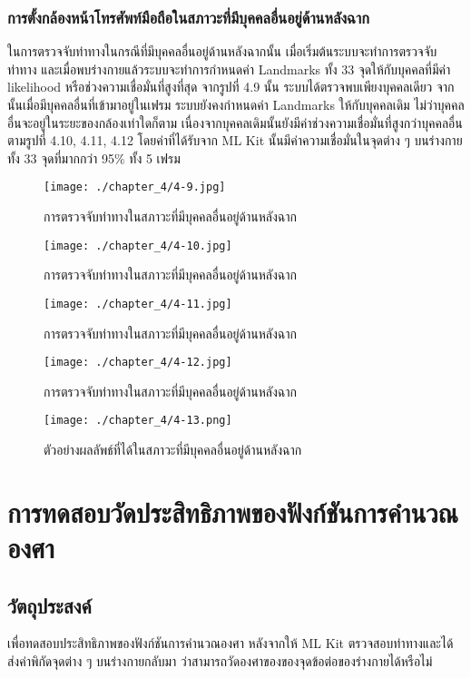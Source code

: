 \subsubsection{การตั้งกล้องหน้าโทรศัพท์มือถือในสภาวะที่มีบุคคลอื่นอยู่ด้านหลังฉาก}
ในการตรวจจับท่าทางในกรณีที่มีบุคคลอื่นอยู่ด้านหลังฉากนั้น เมื่อเริ่มต้นระบบจะทำการตรวจจับท่าทาง และเมื่อพบร่างกายแล้วระบบจะทำการกำหนดค่า Landmarks ทั้ง 33 จุดให้กับบุคคลที่มีค่า likelihood หรือช่วงความเชื่อมั่นที่สูงที่สุด จากรูปที่ 4.9 นั้น ระบบได้ตรวจพบเพียงบุคคลเดียว จากนั้นเมื่อมีบุคคลอื่นที่เข้ามาอยู่ในเฟรม ระบบยังคงกำหนดค่า Landmarks ให้กับบุคคลเดิม ไม่ว่าบุคคลอื่นจะอยู่ในระยะของกล้องเท่าใดก็ตาม เนื่องจากบุคคลเดิมนั้นยังมีค่าช่วงความเชื่อมั่นที่สูงกว่าบุคคลอื่น ตามรูปที่ 4.10, 4.11, 4.12 โดยค่าที่ได้รับจาก ML Kit นั้นมีค่าความเชื่อมั่นในจุดต่าง ๆ บนร่างกายทั้ง 33 จุดที่มากกว่า 95\% ทั้ง 5 เฟรม
\begin{figure}
	\texttt{[image: ./chapter\_4/4-9.jpg]}
	\caption{การตรวจจับท่าทางในสภาวะที่มีบุคคลอื่นอยู่ด้านหลังฉาก}
\end{figure}
\begin{figure}
	\texttt{[image: ./chapter\_4/4-10.jpg]}
	\caption{การตรวจจับท่าทางในสภาวะที่มีบุคคลอื่นอยู่ด้านหลังฉาก}
\end{figure}
\begin{figure}
	\texttt{[image: ./chapter\_4/4-11.jpg]}
	\caption{การตรวจจับท่าทางในสภาวะที่มีบุคคลอื่นอยู่ด้านหลังฉาก}
\end{figure}
\begin{figure}
	\texttt{[image: ./chapter\_4/4-12.jpg]}
	\caption{การตรวจจับท่าทางในสภาวะที่มีบุคคลอื่นอยู่ด้านหลังฉาก}
\end{figure}
\begin{figure}
	\texttt{[image: ./chapter\_4/4-13.png]}
	\caption{ตัวอย่างผลลัพธ์ที่ได้ในสภาวะที่มีบุคคลอื่นอยู่ด้านหลังฉาก}
\end{figure}

\section{การทดสอบวัดประสิทธิภาพของฟังก์ชันการคำนวณองศา}
\subsection{วัตถุประสงค์}
เพื่อทดสอบประสิทธิภาพของฟังก์ชันการคำนวณองศา หลังจากให้ ML Kit ตรวจสอบท่าทางและได้ส่งค่าพิกัดจุดต่าง ๆ บนร่างกายกลับมา ว่าสามารถวัดองศาของของจุดข้อต่อของร่างกายได้หรือไม่
